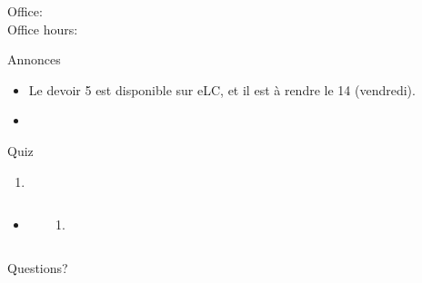 \documentclass{beamer}
\subtitle[Environnement, verbes et subjonctif]{L'environnement, de nouveaux verbes et... plus de subjonctif!}
\begin{document}
  \begin{frame}
    \titlepage
    \tiny{Office: \\
          Office hours: }
  \end{frame}

  \begin{frame}{Annonces}
    \begin{itemize}
      \item Le devoir 5 est disponible sur eLC, et il est à rendre le 14 (vendredi).
      \item[] 
    \end{itemize}
  \end{frame}

  \begin{frame}{}
    \begin{center}
      \Large Quiz
    \end{center}
  \end{frame}

  \begin{frame}{}
    
    \begin{enumerate}
      \item 
    \end{enumerate}
  \end{frame}

  \begin{frame}{}
    \begin{columns}
      \scriptsize
        
        \begin{itemize}
          \item 
        \end{itemize}
        \begin{enumerate}
          \item 
        \end{enumerate}
    \end{columns}
  \end{frame}

  \begin{frame}{}
    \begin{center}
      \Large Questions?
    \end{center}
  \end{frame}
\end{document}
